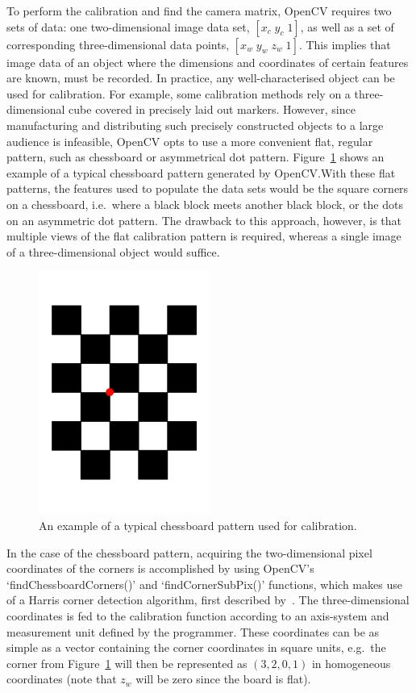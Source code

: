 To perform the calibration and find the camera matrix, OpenCV requires two sets of data: one two-dimensional image data set, $[x_c\;y_c\;1]$, as well as a set of corresponding three-dimensional data points, $[x_w\;y_w\;z_w\;1]$. This implies that image data of an object where the dimensions and coordinates of certain features are known, must be recorded. In practice, any well-characterised object can be used for calibration. For example, some calibration methods rely on a three-dimensional cube covered in precisely laid out markers. However, since manufacturing and distributing such precisely constructed objects to a large audience is infeasible, OpenCV opts to use a more convenient flat, regular pattern, such as chessboard or asymmetrical dot pattern. Figure~\ref{fig:chap2-calib-pattern} shows an example of a typical chessboard pattern generated by OpenCV.\@ With these flat patterns, the features used to populate the data sets would be the square corners on a chessboard, i.e.\ where a black block meets another black block, or the dots on an asymmetric dot pattern. The drawback to this approach, however, is that multiple views of the flat calibration pattern is required, whereas a single image of a three-dimensional object would suffice. 

\begin{figure}
  \centering
  \includegraphics[angle=90, width=0.5\textwidth]{figures/chapter2/chessboard_pattern}
  \caption{An example of a typical chessboard pattern used for calibration.}
\label{fig:chap2-calib-pattern}
\end{figure}

In the case of the chessboard pattern, acquiring the two-dimensional pixel coordinates of the corners is accomplished by using OpenCV's `findChessboardCorners()' and `findCornerSubPix()' functions, which makes use of a Harris corner detection algorithm, first described by~\cite{harris1988combined}. The three-dimensional coordinates is fed to the calibration function according to an axis-system and measurement unit defined by the programmer. These coordinates can be as simple as a vector containing the corner coordinates in square units, e.g.\ the corner from Figure~\ref{fig:chap2-calib-pattern} will then be represented as $(3, 2, 0, 1)$ in homogeneous coordinates (note that $z_w$ will be zero since the board is flat). 

